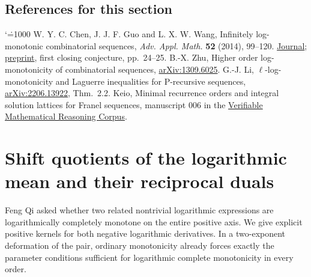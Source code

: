 \documentclass[11pt,a4paper]{article}
\makeatletter
\numberwithin{equation}{section}
\theoremstyle{definition}
\theoremstyle{remark}
\newenvironment{sectionabstract}{\par\smallskip\begingroup\small\noindent}{\par\endgroup\medskip}
\renewenvironment{thebibliography}[1]
 {\subsection*{References for this section}\small
  \list{\@biblabel{\@arabic\c@enumiv}}
       {\settowidth\labelwidth{\@biblabel{#1}}\leftmargin\labelwidth
        \advance\leftmargin\labelsep\@openbib@code
        \usecounter{enumiv}\let\p@enumiv\@empty
        \renewcommand\theenumiv{\@arabic\c@enumiv}}
  \sloppy\clubpenalty4000\widowpenalty4000\sfcode`\.=1000\relax}
 {\def\@noitemerr{\@latex@warning{Empty bibliography}}\endlist}
\makeatother
\begin{document}
\begin{thebibliography}{9}
 W. Y. C. Chen, J. J. F. Guo and L. X. W. Wang, Infinitely log-monotonic combinatorial sequences, \emph{Adv. Appl. Math.} \textbf{52} (2014), 99--120. \href{https://doi.org/10.1016/j.aam.2013.08.003}{Journal}; \href{https://arxiv.org/pdf/1304.5160}{preprint}, first closing conjecture, pp.~24--25.
 B.-X. Zhu, Higher order log-monotonicity of combinatorial sequences, \href{https://arxiv.org/abs/1309.6025}{arXiv:1309.6025}.
 G.-J. Li, $\ell$-log-monotonicity and Laguerre inequalities for P-recursive sequences, \href{https://arxiv.org/abs/2206.13922}{arXiv:2206.13922}, Thm.~2.2.
 Keio, Minimal recurrence orders and integral solution lattices for Franel sequences, manuscript 006 in the \href{https://github.com/QEEDDD/Verifiable-Mathematical-Reasoning-Corpus}{Verifiable Mathematical Reasoning Corpus}.
\end{thebibliography}

\par\endgroup

\begingroup
\newcommand{\dd}{\,d}
\newcommand{\R}{\mathbb R}
\section{\texorpdfstring{Shift quotients of the logarithmic mean and their reciprocal duals}{Shift quotients of the logarithmic mean and their reciprocal duals}}\label{section:r27keio}
\par\medskip

\begin{sectionabstract}
Feng Qi asked whether two related nontrivial logarithmic expressions are logarithmically completely monotone on the entire positive axis. We give explicit positive kernels for both negative logarithmic derivatives. In a two-exponent deformation of the pair, ordinary monotonicity already forces exactly the parameter conditions sufficient for logarithmic complete monotonicity in every order.
\end{sectionabstract}
\end{document}
